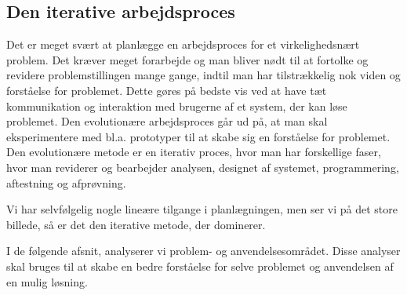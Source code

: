 \subsection{Den iterative arbejdsproces}
\label{subsec:iterativarbejdsproces}

Det er meget svært at planlægge en arbejdsproces for et virkelighedsnært problem. Det kræver meget forarbejde og man bliver nødt til at fortolke og revidere problemstillingen mange gange, indtil man har tilstrækkelig nok viden og forståelse for problemet. Dette gøres på bedste vis ved at have tæt kommunikation og interaktion med brugerne af et system, der kan løse problemet. Den evolutionære arbejdsproces går ud på, at man skal eksperimentere med bl.a. prototyper til at skabe sig en forståelse for problemet. Den evolutionære metode er en iterativ proces, hvor man har forskellige faser, hvor man reviderer og bearbejder analysen, designet af systemet, programmering, aftestning og afprøvning.

Vi har selvfølgelig nogle lineære tilgange i planlægningen, men ser vi på det store billede, så er det den iterative metode, der dominerer.




I de følgende afsnit, analyserer vi problem- og anvendelsesområdet. Disse analyser skal bruges til at skabe en bedre forståelse for selve problemet og anvendelsen af en mulig løsning.